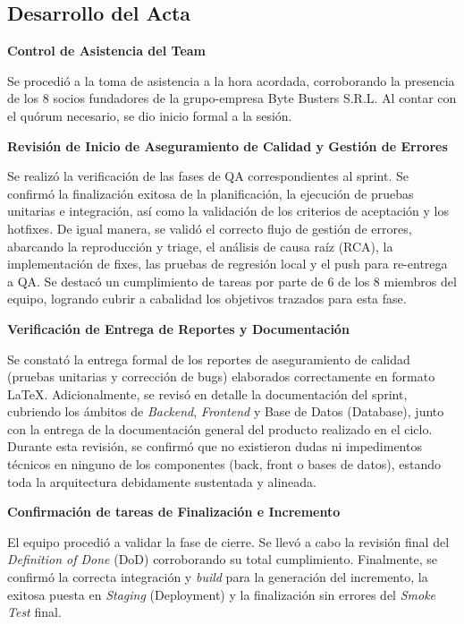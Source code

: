 \newpage
\subsection{Desarrollo del Acta}

\noindent \textbf{Control de Asistencia del Team}\par
Se procedió a la toma de asistencia a la hora acordada, corroborando la presencia de los 8 socios fundadores de la grupo-empresa Byte Busters S.R.L. Al contar con el quórum necesario, se dio inicio formal a la sesión.

\vspace*{0.5cm}
\noindent \textbf{Revisión de Inicio de Aseguramiento de Calidad y Gestión de Errores}\par
Se realizó la verificación de las fases de QA correspondientes al sprint. Se confirmó la finalización exitosa de la planificación, la ejecución de pruebas unitarias e integración, así como la validación de los criterios de aceptación y los hotfixes. De igual manera, se validó el correcto flujo de gestión de errores, abarcando la reproducción y triage, el análisis de causa raíz (RCA), la implementación de fixes, las pruebas de regresión local y el push para re-entrega a QA. Se destacó un cumplimiento de tareas por parte de 6 de los 8 miembros del equipo, logrando cubrir a cabalidad los objetivos trazados para esta fase.

\vspace*{0.5cm}
\noindent \textbf{Verificación de Entrega de Reportes y Documentación}\par
Se constató la entrega formal de los reportes de aseguramiento de calidad (pruebas unitarias y corrección de bugs) elaborados correctamente en formato LaTeX. Adicionalmente, se revisó en detalle la documentación del sprint, cubriendo los ámbitos de \textit{Backend}, \textit{Frontend} y Base de Datos (Database), junto con la entrega de la documentación general del producto realizado en el ciclo. Durante esta revisión, se confirmó que no existieron dudas ni impedimentos técnicos en ninguno de los componentes (back, front o bases de datos), estando toda la arquitectura debidamente sustentada y alineada.

\vspace*{0.5cm}
\noindent \textbf{Confirmación de tareas de Finalización e Incremento}\par
El equipo procedió a validar la fase de cierre. Se llevó a cabo la revisión final del \textit{Definition of Done} (DoD) corroborando su total cumplimiento. Finalmente, se confirmó la correcta integración y \textit{build} para la generación del incremento, la exitosa puesta en \textit{Staging} (Deployment) y la finalización sin errores del \textit{Smoke Test} final.

